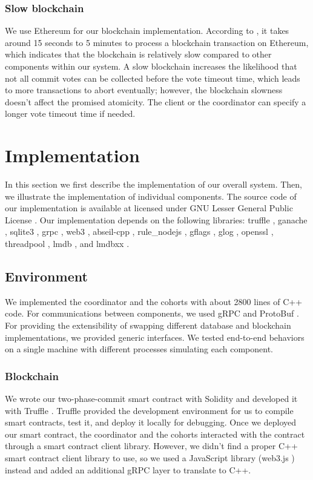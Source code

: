 \documentclass[11pt,sigplan,screen,nonacm]{acmart}
\begin{document}
\subsubsection{Slow blockchain}
We use Ethereum for our blockchain implementation. According to \cite{stationlong}, it takes around 15 seconds to 5 minutes to process a blockchain transaction on Ethereum, which indicates that the blockchain is relatively slow compared to other components within our system. A slow blockchain increases the likelihood that not all commit votes can be collected before the vote timeout time, which leads to more transactions to abort eventually; however, the blockchain slowness doesn’t affect the promised atomicity. The client or the coordinator can specify a longer vote timeout time if needed.

\section{Implementation}
In this section we first describe the implementation of our overall system. Then, we illustrate the implementation of individual components. The source code of our implementation is available at licensed under GNU Lesser General Public License \cite{lgpl}. Our implementation depends on the following libraries: truffle \cite{github_truffle}, ganache \cite{github_ganache}, sqlite3 \cite{github_sqlite3}, grpc \cite{github_grpc}, web3 \cite{github_web3}, abseil-cpp \cite{github_absl}, rule\_nodejs \cite{github_rulejs}, gflags \cite{github_gflags}, glog \cite{github_glog}, openssl \cite{github_openssl}, threadpool \cite{Shoshany2021_ThreadPool}, lmdb \cite{github_lmdb}, and lmdbxx \cite{github_lmdbxx}.

\subsection{Environment}
We implemented the coordinator and the cohorts with about 2800 lines of C++ code. For communications between components, we used gRPC \cite{github_grpc} and ProtoBuf \cite{github_proto}. For providing the extensibility of swapping different database and blockchain implementations, we provided generic interfaces. We tested end-to-end behaviors on a single machine with different processes simulating each component.

\subsubsection{Blockchain}
We wrote our two-phase-commit smart contract with Solidity and developed it with Truffle \cite{github_truffle}. Truffle provided the development environment for us to compile smart contracts, test it, and deploy it locally for debugging. Once we deployed our smart contract, the coordinator and the cohorts interacted with the contract through a smart contract client library. However, we didn’t find a proper C++ smart contract client library to use, so we used a JavaScript library (web3.js \cite{github_web3}) instead and added an additional gRPC layer to translate to C++.
\end{document}

